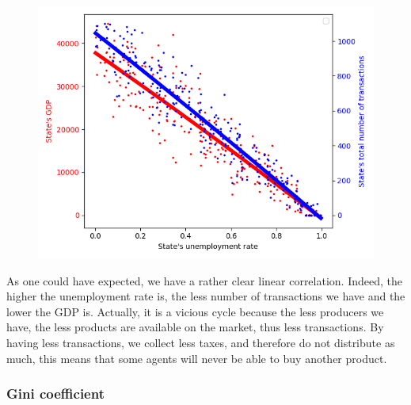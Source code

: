 {{{{{{{{        \begin{figure}
            \includegraphics[width=\linewidth]{img/exp/6_1.png}
        \end{figure} 
        {As one could have expected, we have a rather clear linear correlation. Indeed, the higher the unemployment rate is, the less number of transactions we have and the lower the GDP is. Actually, it is a vicious cycle because the less producers we have, the less products are available on the market, thus less transactions. By having less transactions, we collect less taxes, and therefore do not distribute as much, this means that some agents will never be able to buy another product. 
        \par

        \subsubsection{Gini coefficient}

}}}}}}}}}
